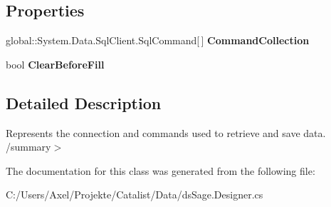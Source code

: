 \subsection*{Properties}
\begin{DoxyCompactItemize}
\item 
global\+::\+System.\+Data.\+Sql\+Client.\+Sql\+Command\mbox{[}$\,$\mbox{]} {\bfseries Command\+Collection}\hypertarget{class_products_1_1_data_1_1ds_sage_table_adapters_1_1ta_david_item_a9a3cae9e696ff4e1d22d6256186f9bc7}{}\label{class_products_1_1_data_1_1ds_sage_table_adapters_1_1ta_david_item_a9a3cae9e696ff4e1d22d6256186f9bc7}

\item 
bool {\bfseries Clear\+Before\+Fill}\hypertarget{class_products_1_1_data_1_1ds_sage_table_adapters_1_1ta_david_item_af7d2a1f555939ba708ca1a01cb58b37d}{}\label{class_products_1_1_data_1_1ds_sage_table_adapters_1_1ta_david_item_af7d2a1f555939ba708ca1a01cb58b37d}

\end{DoxyCompactItemize}


\subsection{Detailed Description}
Represents the connection and commands used to retrieve and save data. /summary$>$ 

The documentation for this class was generated from the following file\+:\begin{DoxyCompactItemize}
\item 
C\+:/\+Users/\+Axel/\+Projekte/\+Catalist/\+Data/ds\+Sage.\+Designer.\+cs\end{DoxyCompactItemize}
